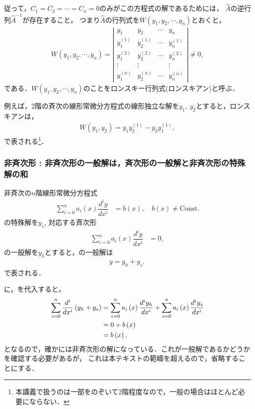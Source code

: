 従って，$C_1 = C_2 = \cdots = C_n = 0$のみがこの方程式の解であるためには，
$\hat{A}$の逆行列$\hat{A}^{-1}$が存在すること，
つまり$\hat{A}$の行列式を$W\left(y_1, y_2, \cdots , y_n\right)$とおくと，
\begin{align}
 W\left(y_1,y_2,\cdots, y_n\right) = 
 \left|\begin{array}{cccc}
y_{1} & y_{2} & \cdots & y_{n}\\
y_{1}^{\left(1\right)} & y_{2}^{\left(1\right)} & \cdots & y_{n}^{\left(1\right)}\\
y_{1}^{\left(2\right)} & y_{2}^{\left(2\right)} & \cdots & y_{n}^{\left(2\right)}\\
\vdots & \vdots &  & \vdots\\
y_{1}^{\left(n\right)} & y_{2}^{\left(n\right)} & \cdots & y_{n}^{\left(n\right)}
\end{array}\right|
 \neq 0,
\end{align}
である．$W\left(y_1,y_2,\cdots,y_n\right)$のことをロンスキー行列式(ロンスキアン)と呼ぶ．

例えば，2階の斉次の線形常微分方程式の線形独立な解を$y_1,~y_2$とすると，ロンスキアンは，
\begin{align}
  W\left(y_1,y_2\right) = y_1 y_2^{(1)} - y_2 y_1^{(1)}, 
\end{align}
で表される\footnote{本講義で扱うのは一部をのぞいて2階程度なので，一般の場合はほとんど必要にならない．}．

\subsubsection{非斉次形 : 非斉次形の一般解は，斉次形の一般解と非斉次形の特殊解の和\label{sec:inhomo_strategy}}
\begin{shadebox}
非斉次の$n$階線形常微分方程式
\begin{align}
 \sum_{i=0}^{n}a_{i}\left(x\right)\dfrac{d^{i}y}{dx^{i}} & =b\left(x\right), \quad b\left(x\right) \neq \mathrm{Const.}
\label{eq:inhomo_linear}
\end{align}
の特殊解を$y_s$, 対応する斉次形
\begin{align}
 \sum_{i=0}^{n}a_{i}\left(x\right)\dfrac{d^{i}y}{dx^{i}} & = 0,
\end{align}
の一般解を$y_h$とすると，の一般解は
\begin{align}
  y = y_{h} + y_{s}, \label{eq:inhomo_linear_sol}
\end{align}
で表される．
\end{shadebox}
%
に，を代入すると，
\begin{align}
 \sum_{i=0}^{n}\dfrac{d^{i}}{dx^{i}}\left(y_{h}+y_{s}\right) & =\sum_{i=0}^{n}a_{i}\left(x\right)\dfrac{d^{i}y_{h}}{dx^{i}}+\sum_{i=0}^{n}a_{i}\left(x\right)\dfrac{d^{i}y_{s}}{dx^{i}}\notag\\
 & =0+b\left(x\right)\notag\\
 & =b\left(x\right), 
\end{align}
となるので，確かには非斉次形の解になっている．これが一般解であるかどうかを確認する必要があるが，
これは本テキストの範疇を超えるので，省略することにする．


